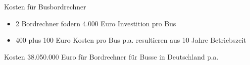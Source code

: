 
\begin{frame}{Kosten für Busbordrechner}
  \begin{itemize}
  \item 2 Bordrechner fodern 4.000 Euro Investition pro Bus
  \item 400 plus 100 Euro Kosten pro Bus p.a. resultieren aus 10 Jahre Betriebszeit
  \end{itemize}
  \begin{block}{Kosten}
    38.050.000 Euro für Bordrechner für Busse in Deutschland p.a.
  \end{block}
\end{frame}
